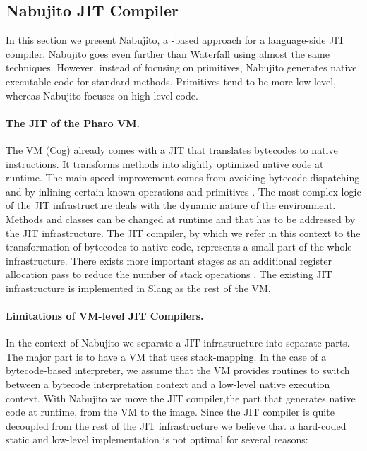 \subsection{Nabujito JIT Compiler}
In this section we present Nabujito, a \B-based approach for a language-side JIT compiler.
Nabujito goes even further than Waterfall using almost the same techniques.
However, instead of focusing on primitives, Nabujito generates native executable code for standard \ST methods.
Primitives tend to be more low-level, whereas Nabujito focuses on high-level \ST code. 


\paragraph{The JIT of the Pharo VM.}
The \PH VM (Cog) already comes with a JIT that translates bytecodes to native instructions.
It transforms \ST methods into slightly optimized native code at runtime.
The main speed improvement comes from avoiding bytecode dispatching and by inlining certain known operations and primitives \cite{Ayco03a}.
The most complex logic of the JIT infrastructure deals with the dynamic nature of the \ST environment.
Methods and classes can be changed at runtime and that has to be addressed by the JIT infrastructure.
The JIT compiler, by which we refer in this context to the transformation of bytecodes to native code, represents a small part of the whole infrastructure.
There exists more important stages as an additional register allocation pass to reduce the number of stack operations \cite{Mira99a,Mira11a}.
The existing JIT infrastructure is implemented in Slang \cite[Ch.\ 5]{Blac09a} as the rest of the VM.

\paragraph{Limitations of VM-level JIT Compilers.}
In the context of Nabujito we separate a JIT infrastructure into separate parts.
The major part is to have a VM that uses stack-mapping.
In the case of a bytecode-based interpreter, we assume that the VM provides routines to switch between a bytecode interpretation context and a low-level native execution context.
With Nabujito we move the JIT compiler,the part that generates native code at runtime, from the VM to the image.%
 Since the JIT compiler is quite decoupled from the rest of the JIT infrastructure we believe that a hard-coded static and low-level implementation is not optimal for several reasons:

